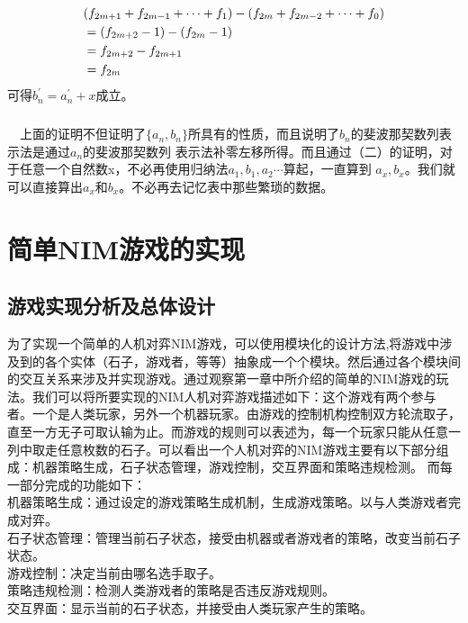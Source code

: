 \documentclass[UTF8,nofonts,cs4size]{ctexrep}
\begin{document}
\begin{align}
&(f_{2m+1}+f_{2m-1}+\cdots + f_1)-(f_{2m}+f_{2m-2}+\cdots + f_0) \notag \\
&=(f_{2m+2}-1)-(f_{2m}-1) \notag \\
&=f_{2m+2}-f_{2m+1}  \notag \\
&=f_{2m}
\end{align}
可得$b_{n}^{'} =a_{n}^{'} + x$成立。
\paragraph{}
\indent\ \
上面的证明不但证明了$\{a_{n},b_{n} \}$所具有的性质，而且说明了$b_n$的斐波那契数列表示法是通过$a_n$的斐波那契数列
表示法补零左移所得。而且通过（二）的证明，对于任意一个自然数x，不必再使用归纳法$a_1,b_1,a_2 \cdots $算起，一直算到
$a_x,b_x$。我们就可以直接算出$a_x$和$b_x$。不必再去记忆表中那些繁琐的数据。
\chapter{简单NIM游戏的实现}
\section{游戏实现分析及总体设计}
为了实现一个简单的人机对弈NIM游戏，可以使用模块化的设计方法,将游戏中涉及到的各个实体（石子，游戏者，等等）抽象成一个个模块。然后通过各个模块间的交互关系来涉及并实现游戏。通过观察第一章中所介绍的简单的NIM游戏的玩法。我们可以将所要实现的NIM人机对弈游戏描述如下：这个游戏有两个参与者。一个是人类玩家，另外一个机器玩家。由游戏的控制机构控制双方轮流取子，直至一方无子可取认输为止。而游戏的规则可以表述为，每一个玩家只能从任意一列中取走任意枚数的石子。可以看出一个人机对弈的NIM游戏主要有以下部分组成：机器策略生成，石子状态管理，游戏控制，交互界面和策略违规检测。
而每一部分完成的功能如下：
\\
\indent
机器策略生成：通过设定的游戏策略生成机制，生成游戏策略。以与人类游戏者完成对弈。
\\
\indent
石子状态管理：管理当前石子状态，接受由机器或者游戏者的策略，改变当前石子状态。
\\
\indent
游戏控制：决定当前由哪名选手取子。
\\
\indent
策略违规检测：检测人类游戏者的策略是否违反游戏规则。
\\
\indent
交互界面：显示当前的石子状态，并接受由人类玩家产生的策略。
\end{document}
